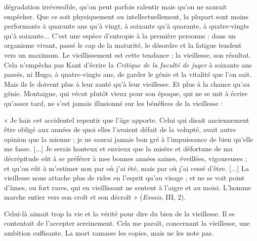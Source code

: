 dégradation irréversible, qu’on peut parfois ralentir mais qu’on ne saurait
empêcher. Que ce soit physiquement ou intellectuellement, la plupart sont
moins performants à quarante ans qu’à vingt, à soixante qu'à quarante, à
quatre-vingts qu'à soixante... C’est une espèce d’entropie à la première
personne : dans un organisme vivant, passé le cap de la maturité, le désordre et
la fatigue tendent vers un maximum. Le vieillissement est cette tendance ; la
vieillesse, son résultat. Cela n’empêcha pas Kant d’écrire la {\it Critique de la faculté
de juger} à soixante ans passés, ni Hugo, à quatre-vingts ans, de garder le génie
et la vitalité que l’on sait. Mais ils le doivent plus à leur santé qu’à leur vieillesse.
Et plus à la chance qu’au génie. Montaigne, qui vécut plutôt vieux pour son
époque, qui ne se mit à écrire qu'assez tard, ne s’est jamais illusionné sur les
bénéfices de la vieillesse :

« Je hais cet accidentel repentir que l’âge apporte. Celui qui disait anciennement
être obligé aux années de quoi elles l'avaient défait de la volupté, avait autre opinion
que la mienne ; je ne saurai jamais bon gré à l’impuissance de bien qu’elle me fasse.
[...] Je serais honteux et envieux que la misère et défortune de ma décrépitude eût à se
préférer à mes bonnes années saines, éveillées, vigoureuses ; et qu’on eût à m’estimer
non par où j'ai été, mais par où j'ai cessé d’être. [...] La vieillesse nous attache plus de
rides en l'esprit qu’au visage ; et ne se voit point d’âmes, ou fort rares, qui en vieillissant
ne sentent à l’aigre et au moisi. L'homme marche entier vers son croît et son décroît »
({\it Essais}, III, 2).

Celui-là aimait trop la vie et la vérité pour dire du bien de la vieillesse. Il se
contentait de l’accepter sereinement. Cela me paraît, concernant la vieillesse,
une ambition suffisante. La mort ramasse les copies, mais ne les note pas.

